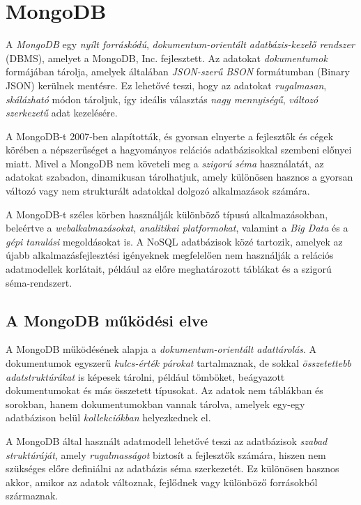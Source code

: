 \documentclass[
]{thesis-ekf}
\theoremstyle{definition}
\theoremstyle{remark}
\begin{document}
\section{MongoDB}
A \emph{MongoDB} egy \emph{nyílt forráskódú}, \emph{dokumentum-orientált adatbázis-kezelő rendszer} (DBMS), amelyet a MongoDB, Inc. fejlesztett. Az adatokat \emph{dokumentumok} formájában tárolja, amelyek általában \emph{JSON-szerű BSON} formátumban (Binary JSON) kerülnek mentésre. Ez lehetővé teszi, hogy az adatokat \emph{rugalmasan}, \emph{skálázható} módon tároljuk, így ideális választás \emph{nagy mennyiségű}, \emph{változó szerkezetű} adat kezelésére.

A MongoDB-t 2007-ben alapították, és gyorsan elnyerte a fejlesztők és cégek körében a népszerűséget a hagyományos relációs adatbázisokkal szembeni előnyei miatt. Mivel a MongoDB nem követeli meg a \emph{szigorú séma} használatát, az adatokat szabadon, dinamikusan tárolhatjuk, amely különösen hasznos a gyorsan változó vagy nem strukturált adatokkal dolgozó alkalmazások számára.

A MongoDB-t széles körben használják különböző típusú alkalmazásokban, beleértve a \emph{webalkalmazásokat}, \emph{analitikai platformokat}, valamint a \emph{Big Data} és a \emph{gépi tanulási} megoldásokat is. A NoSQL adatbázisok közé tartozik, amelyek az újabb alkalmazásfejlesztési igényeknek megfelelően nem használják a relációs adatmodellek korlátait, például az előre meghatározott táblákat és a szigorú séma-rendszert.

\subsection{A MongoDB működési elve}
A MongoDB működésének alapja a \emph{dokumentum-orientált adattárolás}. A dokumentumok egyszerű \emph{kulcs-érték párokat} tartalmaznak, de sokkal \emph{összetettebb adatstruktúrákat} is képesek tárolni, például tömböket, beágyazott dokumentumokat és más összetett típusokat. Az adatok nem táblákban és sorokban, hanem dokumentumokban vannak tárolva, amelyek egy-egy adatbázison belül \emph{kollekciókban} helyezkednek el. \cite{mongodbOfficial}

A MongoDB által használt adatmodell lehetővé teszi az adatbázisok \emph{szabad struktúráját}, amely \emph{rugalmasságot} biztosít a fejlesztők számára, hiszen nem szükséges előre definiálni az adatbázis séma szerkezetét. Ez különösen hasznos akkor, amikor az adatok változnak, fejlődnek vagy különböző forrásokból származnak. \cite{mongodbOfficial}
\end{document}
